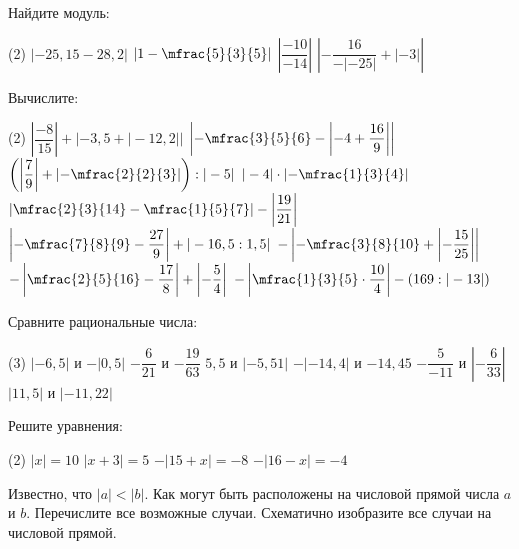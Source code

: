 \begin{class}[number=7-8]
	\begin{listofex}
		\item Найдите модуль:
		\begin{tasks}(2)
			\task \( |-25,15-28,2|  \)
			\task \(  \left|1-\mfrac{5}{3}{5}\right| \)
			\task \(  \left|\dfrac{-10}{-14}\right| \)
			\task \(  \left|-\dfrac{16}{-|-25|} + |-3| \right| \)
		\end{tasks}
		\item Вычислите:
		\begin{tasks}(2)
			\task \(  \left|\dfrac{-8}{15}\right| + |-3,5+|-12,2|| \)
			\task \(  \left|-\mfrac{3}{5}{6} - \left|-4+\dfrac{16}{9}\right|\right| \)
			\task \( \left( \left|\dfrac{7}{9}\right|+\left|-\mfrac{2}{2}{3}\right| \right) :|-5| \)
			\task \( |-4|\cdot\left|-\mfrac{1}{3}{4}\right| \)
			\task \( \left|\mfrac{2}{3}{14}-\mfrac{1}{5}{7}\right|-\left|\dfrac{19}{21}\right| \)
			\task \(  \left|-\mfrac{7}{8}{9} -\dfrac{27}{9}\right| + |-16,5:1,5| \)
			\task \( -\left|-\mfrac{3}{8}{10} + \left|-\dfrac{15}{25}\right|\right| \)
			\task \( -\left|\mfrac{2}{5}{16}-\dfrac{17}{8}\right|+\left|-\dfrac{5}{4}\right| \)
			\task \( -\left|\mfrac{1}{3}{5} \cdot \dfrac{10}{4}\right|- (169:|-13|) \)
		\end{tasks}
		\item Сравните рациональные числа:
		\begin{tasks}(3)
			\task \( |-6,5| \) и \( -|0,5| \)
			\task \( -\dfrac{6}{21} \) и \( -\dfrac{19}{63} \)
			\task \( 5,5 \) и \( |-5,51| \)
			\task \( -|-14,4| \) и \( -14,45 \)
			\task \( -\dfrac{5}{-11} \) и \( \left| -\dfrac{6}{33} \right| \)
			\task \( |11,5| \) и \( |-11,22| \)
		\end{tasks}
		\item Решите уравнения:
		\begin{tasks}(2)
			\task \( |x|=10 \)
			\task \( |x+3|=5 \)
			\task \( -|15+x|=-8 \)
			\task \( -|16-x|=-4 \)
		\end{tasks}
		\item Известно, что \( |a|<|b| \). Как могут быть расположены на числовой прямой числа \( a \) и \( b \). Перечислите все возможные случаи. Схематично изобразите все случаи на числовой прямой.

\end{listofex}
\end{class}
